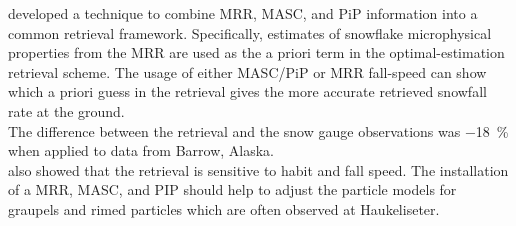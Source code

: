 \cite{cooper_variational_2017} developed a technique to combine MRR, MASC, and PiP information into a common retrieval framework. Specifically, estimates of snowflake microphysical properties from the MRR are used as the a priori term in the optimal-estimation retrieval scheme. The usage of either MASC/PiP or MRR fall-speed can show which a priori guess in the retrieval gives the more accurate retrieved snowfall rate at the ground. \\
The difference between the retrieval and the snow gauge observations was \SI{-18}{\percent} when applied to data from Barrow, Alaska.\\
\cite{cooper_variational_2017} also showed that the retrieval is sensitive to habit and fall speed. The installation of a MRR, MASC, and PIP should help to adjust the particle models for graupels and rimed particles which are often observed at Haukeliseter. 

